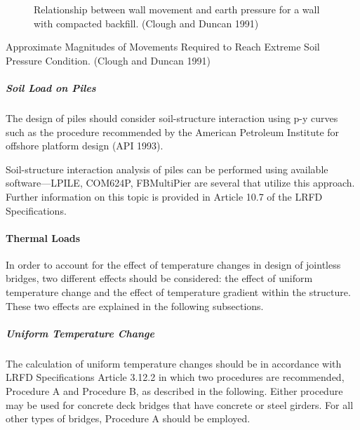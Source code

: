 \begin{figure}
  \caption{Relationship between wall movement and earth pressure for a wall with compacted backfill. (Clough and  Duncan 1991)}\label{fig:wall-movement-earth-pressure-backfill}
\end{figure}

\begin{table}
  \caption{Approximate Magnitudes of Movements Required to Reach Extreme Soil Pressure Condition. (Clough and Duncan 1991)}\label{tab:movement-reach-extreme}
\end{table}

\subparagraph{Soil Load on Piles}
The design of piles should consider soil-structure interaction using p-y curves such as the procedure
recommended by the American Petroleum Institute for offshore platform design (API 1993).

Soil-structure interaction analysis of piles can be performed using available software—LPILE, COM624P, FBMultiPier
are several that utilize this approach. Further information on this topic is provided in Article 10.7 of the
LRFD Specifications.

\paragraph{Thermal Loads}

In order to account for the effect of temperature changes in design of jointless bridges, two different effects
should be considered: the effect of uniform temperature change and the effect of temperature gradient within the
structure. These two effects are explained in the following subsections.

\subparagraph{Uniform Temperature Change}
The calculation of uniform temperature changes should be in accordance with LRFD Specifications Article 3.12.2
in which two procedures are recommended, Procedure A and Procedure B, as described in the following. Either
procedure may be used for concrete deck bridges that have concrete or steel girders. For all other types of bridges,
Procedure A should be employed.

